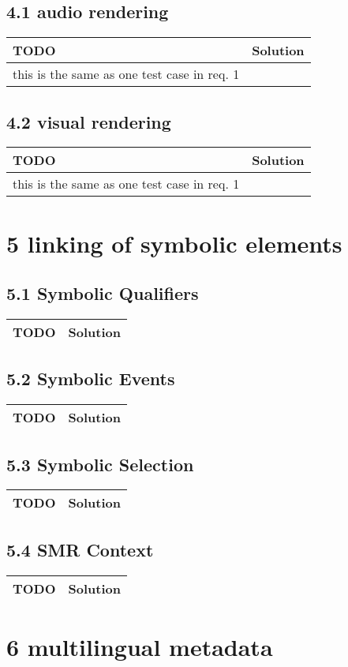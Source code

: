  \subsection*{4.1 audio rendering}
 \begin{tabular}{|p{}|p{}|}
 \hline
 \textbf{TODO} &
 \textbf{Solution} 
\\
 \hline
	this is the same as one test case in req. 1 &
  
\\ 	\hline
 \end{tabular} \subsection*{4.2 visual rendering}
 \begin{tabular}{|p{}|p{}|}
 \hline
 \textbf{TODO} &
 \textbf{Solution} 
\\
 \hline
	this is the same as one test case in req. 1 &
  
\\ 	\hline
 \end{tabular} \section*{5 linking of symbolic elements}
 \subsection*{5.1 Symbolic Qualifiers}
 \begin{tabular}{|p{}|p{}|}
 \hline
 \textbf{TODO} &
 \textbf{Solution} 
\\
 \hline
 \end{tabular} \subsection*{5.2 Symbolic Events}
 \begin{tabular}{|p{}|p{}|}
 \hline
 \textbf{TODO} &
 \textbf{Solution} 
\\
 \hline
 \end{tabular} \subsection*{5.3 Symbolic Selection}
 \begin{tabular}{|p{}|p{}|}
 \hline
 \textbf{TODO} &
 \textbf{Solution} 
\\
 \hline
 \end{tabular} \subsection*{5.4 SMR Context}
 \begin{tabular}{|p{}|p{}|}
 \hline
 \textbf{TODO} &
 \textbf{Solution} 
\\
 \hline
 \end{tabular} \section*{6 multilingual metadata}

